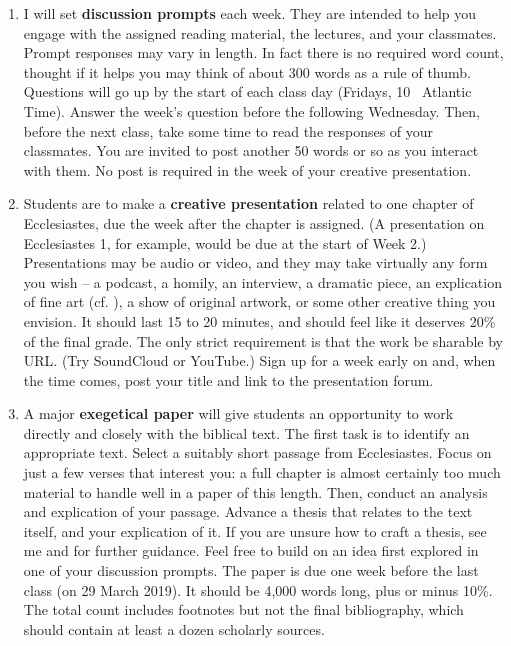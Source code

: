 \documentclass[titlepage]{article}
\begin{document}
\begin{enumerate}

	\item I will set \textbf{discussion prompts} each week. They are
	intended to help you engage with the assigned reading material, the
	lectures, and your classmates. Prompt responses may vary in length.
	In fact there is no required word count, thought if it helps you may
	think of about 300 words as a rule of thumb. Questions will go up by
	the start of each class day (Fridays, 10 \AM\ Atlantic Time). Answer
	the week's question before the following Wednesday. Then, before the
	next class, take some time to read the responses of your classmates.
	You are invited to post another 50 words or so as you interact with
	them. No post is required in the week of your creative presentation.

	\item Students are to make a \textbf{creative presentation} related
	to one chapter of Ecclesiastes, due the week after the chapter is
	assigned. (A presentation on Ecclesiastes 1, for example, would be
	due at the start of Week 2.) Presentations may be audio or video,
	and they may take virtually any form you wish -- a podcast, a
	homily, an interview, a dramatic piece, an explication of fine art
	(cf. \cite{Christianson}), a show of original artwork, or some other
	creative thing you envision. It should last 15 to 20 minutes, and
	should feel like it deserves 20\% of the final grade. The only
	strict requirement is that the work be sharable by URL. (Try
	SoundCloud or YouTube.) Sign up for a week early on and, when the
	time comes, post your title and link to the presentation forum.

	\item A major \textbf{exegetical paper} will give students an
	opportunity to work directly and closely with the biblical text. The
	first task is to identify an appropriate text.  Select a suitably
	short passage from Ecclesiastes. Focus on just a few verses that
	interest you: a full chapter is almost certainly too much material
	to handle well in a paper of this length. Then, conduct an analysis
	and explication of your passage. Advance a thesis that relates to
	the text itself, and your explication of it. If you are unsure how
	to craft a thesis, see me and \cite[Chs 3, 5, 8, 11]{rlgs} for
	further guidance. Feel free to build on an idea first explored in
	one of your discussion prompts. The paper is due one week before the
	last class (on 29 March 2019). It should be 4,000 words long, plus
	or minus 10\%. The total count includes footnotes but not the final
	bibliography, which should contain at least a dozen scholarly
	sources.

\end{enumerate}
\end{document}
